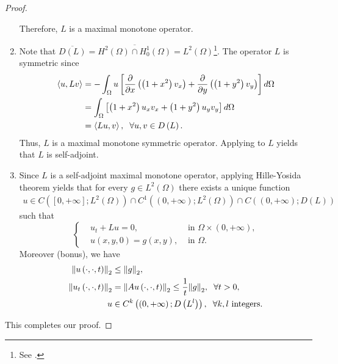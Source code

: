 \documentclass[11pt,a4paper]{article}
\numberwithin{equation}{section}
\numberwithin{equation}{section}
\begin{document}
\begin{proof}
\begin{enumerate}
Therefore, $L$ is a maximal monotone operator.
\item Note that $\overline {D\left( L \right)}  = \overline {{H^2}\left( \Omega  \right) \cap H_0^1\left( \Omega  \right)}  = {L^2}\left( \Omega  \right)$\footnote{See \cite[Corollary 4.23, p.109]{Haim}.}. The operator $L$ is symmetric since 
\begin{align}
\left\langle {u,Lv} \right\rangle  &=  - \int_\Omega  {u\left[ {\frac{\partial }{{\partial x}}\left( {\left( {1 + {x^2}} \right){v_x}} \right) + \frac{\partial }{{\partial y}}\left( {\left( {1 + {y^2}} \right){v_y}} \right)} \right]d\Omega } \\
& = \int_\Omega  {\left[ {\left( {1 + {x^2}} \right){u_x}{v_x} + \left( {1 + {y^2}} \right){u_y}{v_y}} \right]d\Omega } \\
& = \left\langle {Lu,v} \right\rangle ,\hspace{0.2cm}\forall u,v \in D\left( L \right).
\end{align}
Thus, $L$ is a maximal monotone symmetric operator. Applying \cite[Proposition 7.6, p. 193]{Haim} to $L$ yields that $L$ is self-adjoint.
\item Since $L$ is a self-adjoint maximal monotone operator, applying Hille-Yosida theorem \cite[Theorem 7.7, p. 194]{Haim} yields that for every $g\in L^2\left(\Omega\right)$ there exists a unique function
\begin{align}
u \in C\left( {\left[ {0, + \infty } \right];{L^2}\left( \Omega  \right)} \right) \cap {C^1}\left( {\left( {0, + \infty } \right);{L^2}\left( \Omega  \right)} \right) \cap C\left( {\left( {0, + \infty } \right);D\left( L \right)} \right)
\end{align}
such that
\begin{equation}
\left\{ \begin{split}
& u_t + Lu = 0, & \mbox{ in } \Omega \times \left( {0, + \infty } \right),\\
& u\left( x,y,0 \right) = g\left(x,y\right), & \mbox{ in } \Omega .
\end{split} \right.
\end{equation}
Moreover (bonus), we have
\begin{align}
{\left\| {u\left( { \cdot , \cdot ,t} \right)} \right\|_2} &\le {\left\| g \right\|_2},\\
{\left\| {{u_t}\left( { \cdot , \cdot ,t} \right)} \right\|_2} &= {\left\| {Au\left( { \cdot , \cdot ,t} \right)} \right\|_2} \le \frac{1}{t}{\left\| g \right\|_2},\hspace{0.2cm}\forall t > 0,\\
u &\in {C^k}\left( {\left( {0, + \infty } \right);D\left( {{L^l}} \right)} \right),\hspace{0.2cm}\forall k,l \mbox{ integers}.
\end{align}
\end{enumerate}
This completes our proof.
\end{proof}
\end{document}
